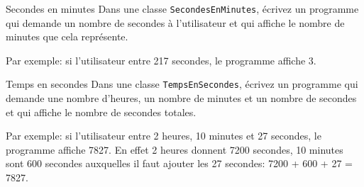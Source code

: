 \documentclass[a4paper,11pt]{article}
\begin{document}
	
	\begin{Exercice}{Secondes en minutes} 
		Dans une classe \texttt{SecondesEnMinutes}, écrivez un programme qui demande 
		un nombre de secondes à l'utilisateur
		et qui affiche le nombre de minutes que cela représente.

		Par exemple: 
		si l'utilisateur entre 217 secondes, le programme affiche 3. 
	\end{Exercice}

	\begin{Exercice}{Temps en secondes} 
		Dans une classe \texttt{TempsEnSecondes}, écrivez un programme qui demande 
		une nombre d'heures, un nombre de minutes et un nombre de secondes
		et qui affiche le nombre de secondes totales.
		
		Par exemple: si l'utilisateur entre 2 heures, 10 minutes et 27 secondes, le programme affiche
		7827. En effet 2 heures donnent 7200 secondes, 10 minutes sont 600 secondes 
		auxquelles il faut ajouter les 27 secondes: 7200 + 600 + 27 = 7827. 
	\end{Exercice}

\end{document}
